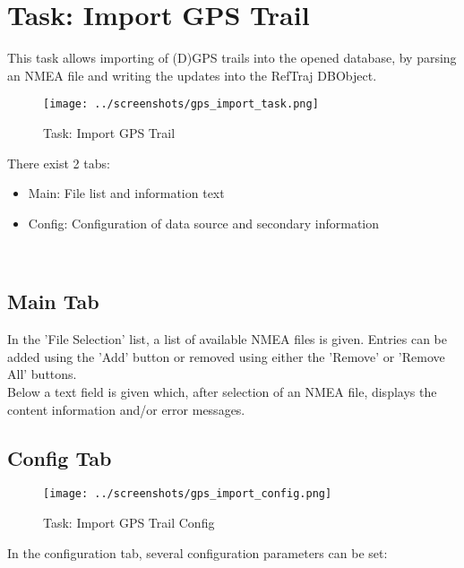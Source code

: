 \section{Task: Import GPS Trail}
\label{sec:task_import_gps} 

This task allows importing of (D)GPS trails into the opened database, by parsing an NMEA file and writing the updates into the RefTraj DBObject.

\begin{figure}[H]
  \hspace*{-2.5cm}
    \texttt{[image: ../screenshots/gps\_import\_task.png]}
  \caption{Task: Import GPS Trail}
\end{figure}

There exist 2 tabs:

\begin{itemize}  
\item Main: File list and information text
\item Config: Configuration of data source and secondary information
\end{itemize}
\ \\

\subsection{Main Tab}

In the 'File Selection' list, a list of available NMEA files is given. Entries can be added using the 'Add' button or removed using either the 'Remove' or 'Remove All' buttons. \\

Below a text field is given which, after selection of an NMEA file, displays the content information and/or error messages. \\

\subsection{Config Tab}

\begin{figure}[H]
    \texttt{[image: ../screenshots/gps\_import\_config.png]}
  \caption{Task: Import GPS Trail Config}
\end{figure}

In the configuration tab, several configuration parameters can be set:

